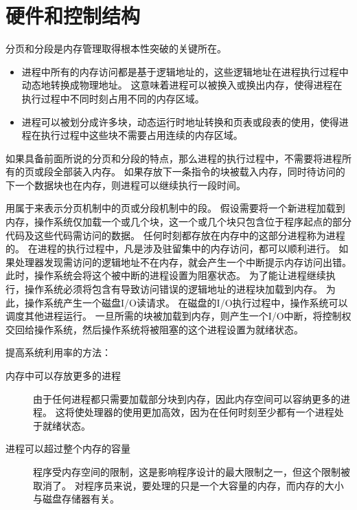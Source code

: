 
\section{硬件和控制结构}
{
    分页和分段是内存管理取得根本性突破的关键所在。

    \begin{itemize}
        \item
        {
            进程中所有的内存访问都是基于逻辑地址的，这些逻辑地址在进程执行过程中动态地转换成物理地址。
            这意味着进程可以被换入或换出内存，使得进程在执行过程中不同时刻占用不同的内存区域。
        }
        \item 进程可以被划分成许多块，动态运行时地址转换和页表或段表的使用，使得进程在执行过程中这些块不需要占用连续的内存区域。
    \end{itemize}

    如果具备前面所说的分页和分段的特点，那么进程的执行过程中，不需要将进程所有的页或段全部装入内存。
    如果存放下一条指令的块被载入内存，同时待访问的下一个数据块也在内存，则进程可以继续执行一段时间。

    用属于来表示分页机制中的页或分段机制中的段。
    假设需要将一个新进程加载到内存，操作系统仅加载一个或几个块，这一个或几个块只包含位于程序起点的部分代码及这些代码需访问的数据。
    任何时刻都存放在内存中的这部分进程称为进程的。
    在进程的执行过程中，凡是涉及驻留集中的内存访问，都可以顺利进行。
    如果处理器发现需访问的逻辑地址不在内存，就会产生一个中断提示内存访问出错。
    此时，操作系统会将这个被中断的进程设置为阻塞状态。
    为了能让进程继续执行，操作系统必须将包含有导致访问错误的逻辑地址的进程块加载到内存。
    为此，操作系统产生一个磁盘I/O读请求。
    在磁盘的I/O执行过程中，操作系统可以调度其他进程运行。
    一旦所需的块被加载到内存，则产生一个I/O中断，将控制权交回给操作系统，然后操作系统将被阻塞的这个进程设置为就绪状态。

    提高系统利用率的方法：

    \begin{description}
        \item[内存中可以存放更多的进程]
        {
            由于任何进程都只需要加载部分块到内存，因此内存空间可以容纳更多的进程。
            这将使处理器的使用更加高效，因为在任何时刻至少都有一个进程处于就绪状态。
        }
        \item[进程可以超过整个内存的容量]
        {
            程序受内存空间的限制，这是影响程序设计的最大限制之一，但这个限制被取消了。
            对程序员来说，要处理的只是一个大容量的内存，而内存的大小与磁盘存储器有关。
        }
    \end{description}

}
